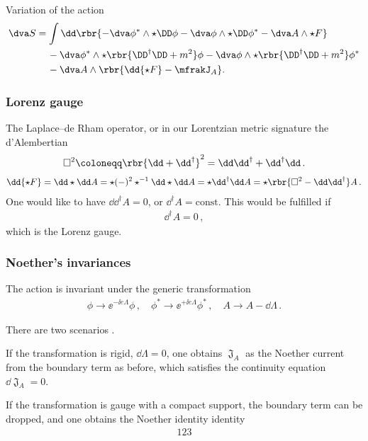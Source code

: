 \documentclass[a4paper]{article}
\begin{document}
Variation of the action
\begin{align}
\dva S &=
\int \dd\rbr{-\dva\phi^*\wedge\star\DD\phi -
\dva\phi\wedge\star\DD\phi^* - \dva A \wedge\star F}
\nonumber \\
&\quad\,-
\dva\phi^*\wedge\star\rbr{\DD^{\dagger}\DD + m^2}\phi -
\dva\phi\wedge\star\rbr{\DD^{\dagger}\DD + m^2}\phi^*
\nonumber \\
&\quad\,-
\dva A\wedge\rbr{\dd{\star F} - \mfrakJ_{A}}.
\end{align}

\subsubsection{Lorenz gauge}
The Laplace--de Rham operator, or in our Lorentzian metric signature the 
d'Alembertian
\begin{align}
\square^2 \coloneqq \rbr{\dd + \dd^{\dagger}}^2 =
	\dd \dd^{\dagger} + \dd^{\dagger} \dd\,.
\end{align}
\begin{align}
\dd{\star F} = \dd\star \dd A = \star (-)^2 \star^{-1}\dd\star\dd A =
	\star \dd^{\dagger} \dd A = \star\rbr{\square^2 - \dd \dd^{\dagger}} A\,.
\end{align}
One would like to have $\dd \dd^{\dagger} A = 0$, or $\dd^{\dagger} A = 
\text{const}$. This would be fulfilled if
\begin{align}
\dd^{\dagger} A = 0\,,
\end{align}
which is the Lorenz gauge\cite{Lorenz1867,Bladel1991a,Bladel1991b}.

\subsubsection{Noether's invariances}

The action is invariant under the generic transformation
\begin{align}
\phi \to \ee^{-\ii e \Lambda} \phi\,,\quad
\phi^* \to \ee^{+\ii e \Lambda} \phi^*\,,\quad
A \to A - \dd \Lambda\,.
\end{align}

There are two scenarios \cite{Avery2015}.

If the transformation is rigid, $\dd \Lambda = 0$, one obtains $\mfrakJ_A$ as 
the Noether current from the boundary term as before, which satisfies the 
continuity equation $\dd \mfrakJ_A = 0$.

If the transformation is gauge with a compact support, the boundary term can be
dropped, and one obtains the Noether identity
identity
\begin{align}
123
\end{align}
\end{document}
